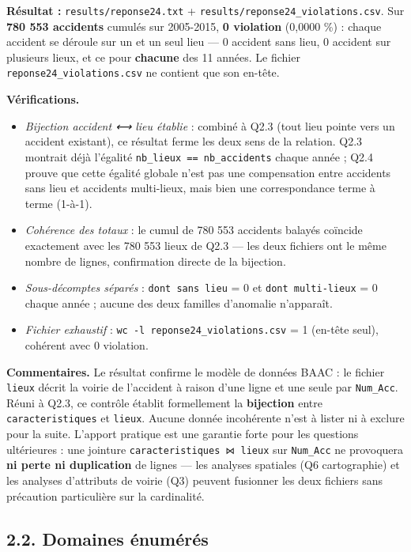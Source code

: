 \documentclass[11pt,a4paper]{article}
\newcommand{\rub}[2]{\textbf{\textcolor{#1}{#2}}}
\begin{document}
\rub{labresultat}{Résultat :} \texttt{results/reponse24.txt} + \texttt{results/reponse24\_violations.csv}. Sur \textbf{780 553 accidents} cumulés sur 2005-2015, \textbf{0 violation} (0,0000 \%) : chaque accident se déroule sur un et un seul lieu — 0 accident sans lieu, 0 accident sur plusieurs lieux, et ce pour \textbf{chacune} des 11 années. Le fichier \texttt{reponse24\_violations.csv} ne contient que son en-tête.

\rub{labanalyse}{Vérifications.}

\begin{itemize}
\item \emph{Bijection accident ⟷ lieu établie} : combiné à Q2.3 (tout lieu pointe vers un accident existant), ce résultat ferme les deux sens de la relation. Q2.3 montrait déjà l'égalité \texttt{nb\_lieux == nb\_accidents} chaque année ; Q2.4 prouve que cette égalité globale n'est pas une compensation entre accidents sans lieu et accidents multi-lieux, mais bien une correspondance terme à terme (1-à-1).
\item \emph{Cohérence des totaux} : le cumul de 780 553 accidents balayés coïncide exactement avec les 780 553 lieux de Q2.3 — les deux fichiers ont le même nombre de lignes, confirmation directe de la bijection.
\item \emph{Sous-décomptes séparés} : \texttt{dont sans lieu} = 0 et \texttt{dont multi-lieux} = 0 chaque année ; aucune des deux familles d'anomalie n'apparaît.
\item \emph{Fichier exhaustif} : \texttt{wc -l reponse24\_violations.csv} = 1 (en-tête seul), cohérent avec 0 violation.
\end{itemize}

\rub{labcomment}{Commentaires.} Le résultat confirme le modèle de données BAAC : le fichier \texttt{lieux} décrit la voirie de l'accident à raison d'une ligne et une seule par \texttt{Num\_Acc}. Réuni à Q2.3, ce contrôle établit formellement la \textbf{bijection} entre \texttt{caracteristiques} et \texttt{lieux}. Aucune donnée incohérente n'est à lister ni à exclure pour la suite. L'apport pratique est une garantie forte pour les questions ultérieures : une jointure \texttt{caracteristiques ⋈ lieux} sur \texttt{Num\_Acc} ne provoquera \textbf{ni perte ni duplication} de lignes — les analyses spatiales (Q6 cartographie) et les analyses d'attributs de voirie (Q3) peuvent fusionner les deux fichiers sans précaution particulière sur la cardinalité.

\subsection*{2.2. Domaines énumérés}
\end{document}
